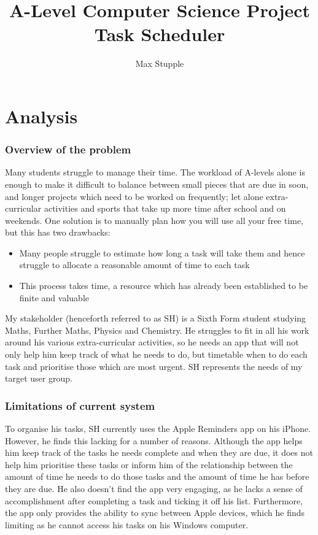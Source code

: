 \documentclass{article}
\title{A-Level Computer Science Project\\ Task Scheduler}
\author{Max Stupple}
\date{}
\begin{document}
\maketitle
\pagebreak

\tableofcontents
\pagebreak

\part{Analysis}
\section{Overview of the problem}
Many students struggle to manage their time. The workload of A-levels alone is
enough to make it difficult to balance between small pieces that are due in
soon, and longer projects which need to be worked on frequently; let
alone extra-curricular activities and sports that take up more time after school
and on weekends. One solution is to manually plan how you will use all your free
time, but this has two drawbacks:

\begin{samepage}
	\begin{itemize}
		\item Many people struggle to estimate how long a task will take them and hence
		      struggle to allocate a reasonable amount of time to each task
		\item This process takes time, a resource which has already been established to
		      be finite and valuable
	\end{itemize}
\end{samepage}

My stakeholder (henceforth referred to as SH) is a Sixth Form student
studying Maths, Further Maths, Physics and Chemistry. He struggles to fit in all
his work around his various extra-curricular activities, so he needs an app that
will not only help him keep track of what he needs to do, but timetable when to do each task and prioritise those which are most urgent. SH represents the needs
of my target user group.

\section{Limitations of current system}
To organise his tasks, SH currently uses the Apple Reminders app on his iPhone.
However, he finds this lacking for a number of reasons. Although the app helps
him keep track of the tasks he needs complete and when they are due, it does not
help him prioritise these tasks or inform him of the relationship between the
amount of time he needs to do those tasks and the amount of time he has before
they are due. He also doesn't find the app very engaging, as he lacks a sense of
accomplishment after completing a task and ticking it off his list. Furthermore,
the app only provides the ability to sync between Apple devices, which he finds
limiting as he cannot access his tasks on his Windows computer.
\end{document}
